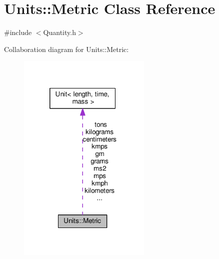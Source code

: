 \hypertarget{class_units_1_1_metric}{\section{Units\+:\+:Metric Class Reference}
\label{class_units_1_1_metric}
}


{\ttfamily \#include $<$Quantity.\+h$>$}



Collaboration diagram for Units\+:\+:Metric\+:\nopagebreak
\begin{figure}[H]
\begin{center}
\leavevmode
\includegraphics[width=180pt]{class_units_1_1_metric__coll__graph}
\end{center}
\end{figure}
